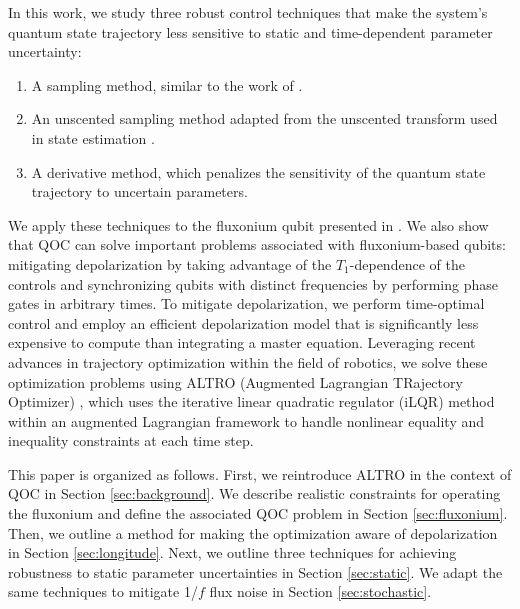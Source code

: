 In this work, we study three robust control techniques that
make the system's quantum state trajectory less sensitive
to static and time-dependent parameter uncertainty:
\begin{enumerate}
  \item A sampling method, similar to the work of \cite{allen2019robust,
    carvalho2020error, khaneja2005optimal, reinhold2019controlling, rembold2020introduction}.
  \item An unscented sampling method adapted from the unscented transform used in
    state estimation \cite{howell2020direct, julier2004unscented,
      lee2013sigma, manchester2016derivative}.
  \item A derivative method, which penalizes the sensitivity of the quantum state trajectory
    to uncertain parameters.
\end{enumerate}
We apply these techniques to the fluxonium qubit presented in \cite{zhang2020universal}.
We also show that QOC can solve important problems associated with
fluxonium-based qubits: mitigating
depolarization by taking advantage of the $T_{1}$-dependence of the controls
and synchronizing qubits with distinct frequencies
by performing phase gates in arbitrary times.
To mitigate depolarization,
we perform time-optimal control and
employ an efficient depolarization model that 
is significantly less expensive to compute than integrating a master equation.
Leveraging recent advances in trajectory optimization within the field of robotics, we
solve these optimization problems using ALTRO (Augmented Lagrangian TRajectory Optimizer)
\cite{howell2019altro}, which uses the iterative linear quadratic regulator (iLQR) method
\cite{Li2004a} within an augmented Lagrangian framework \cite{lantoine2012hybrid,
  plancher2017constrained}
to handle nonlinear equality and inequality constraints at 
each time step.

This paper is organized as follows.
First, we reintroduce ALTRO in the context of QOC
in Section \ref{sec:background}.
We describe realistic constraints for operating the fluxonium and
define the associated QOC problem in Section \ref{sec:fluxonium}.
Then, we outline a method for making the optimization aware of depolarization
in Section \ref{sec:longitude}. Next, we outline three techniques for achieving
robustness to static parameter uncertainties in Section \ref{sec:static}. We
adapt the same techniques to mitigate 1/$f$ flux noise
in Section \ref{sec:stochastic}.
